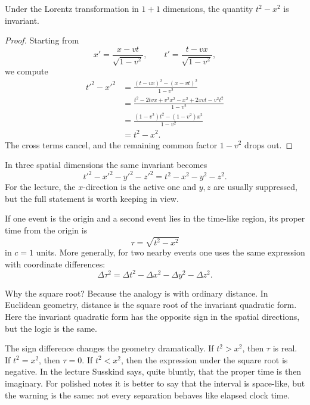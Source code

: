 \begin{proposition}
Under the Lorentz transformation in \(1+1\) dimensions, the quantity \(t^2-x^2\) is invariant.
\end{proposition}

\begin{proof}
Starting from
\begin{equation}
x'=\frac{x-vt}{\sqrt{1-v^2}},
\qquad
t'=\frac{t-vx}{\sqrt{1-v^2}},
\end{equation}
we compute
\begin{align}
t'^2-x'^2
&= \frac{(t-vx)^2-(x-vt)^2}{1-v^2} \\
&= \frac{t^2-2tvx+v^2x^2-x^2+2xvt-v^2t^2}{1-v^2} \\
&= \frac{(1-v^2)t^2-(1-v^2)x^2}{1-v^2} \\
&= t^2-x^2.
\end{align}
The cross terms cancel, and the remaining common factor \(1-v^2\) drops out.
\end{proof}

In three spatial dimensions the same invariant becomes
\begin{equation}
t'^2-x'^2-y'^2-z'^2 = t^2-x^2-y^2-z^2.
\end{equation}
For the lecture, the \(x\)-direction is the active one and \(y,z\) are usually suppressed, but the full statement is worth keeping in view.

\begin{definition}
If one event is the origin and a second event lies in the time-like region, its proper time from the origin is
\begin{equation}
\tau=\sqrt{t^2-x^2}
\end{equation}
in \(c=1\) units. More generally, for two nearby events one uses the same expression with coordinate differences:
\begin{equation}
\Delta \tau^2 = \Delta t^2-\Delta x^2-\Delta y^2-\Delta z^2.
\end{equation}
\end{definition}

Why the square root? Because the analogy is with ordinary distance. In Euclidean geometry, distance is the square root of the invariant quadratic form. Here the invariant quadratic form has the opposite sign in the spatial directions, but the logic is the same.

The sign difference changes the geometry dramatically. If \(t^2>x^2\), then \(\tau\) is real. If \(t^2=x^2\), then \(\tau=0\). If \(t^2<x^2\), then the expression under the square root is negative. In the lecture Susskind says, quite bluntly, that the proper time is then imaginary. For polished notes it is better to say that the interval is space-like, but the warning is the same: not every separation behaves like elapsed clock time.

